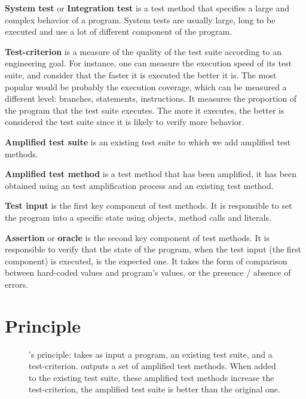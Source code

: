 \textbf{System test} or \textbf{Integration test} is a test method that specifies a large and complex behavior of a program.
System tests are usually large, long to be executed and use a lot of different component of the program.

\textbf{Test-criterion} is a measure of the quality of the test suite according to an engineering goal.
For instance, one can measure the execution speed of its test suite, and consider that the faster it is executed the better it is.
The most popular would be probably the execution coverage, which can be measured a different level: branches, statements, instructions.
It measures the proportion of the program that the test suite executes.
The more it executes, the better is considered the test suite since it is likely to verify more behavior.

\textbf{Amplified test suite} is an existing test suite to which we add amplified test methods.

\textbf{Amplified test method} is a test method that has been amplified, \ie it has been obtained using an test amplification process and an existing test method.

\textbf{Test input} is the first key component of test methods. 
It is responsible to set the program into a specific state using objects, method calls and literals.

\textbf{Assertion} or \textbf{oracle} is the second key component of test methods. 
It is responsible to verify that the state of the program, when the test input (the first component) is executed, is the expected one. 
It takes the form of comparison between hard-coded values and program's values, or the presence / absence of errors.

\section{Principle}
\label{sec:dspot:principle}

\begin{figure}[h]
	\centering
	\caption{
		\dspot's principle: \dspot takes as input a program, an existing test suite, and a test-criterion. 
		\dspot outputs a set of amplified test methods.
		When added to the existing test suite, these amplified test methods increase the test-criterion, \ie the amplified test suite is better than the original one.
	}
	\label{fig:dspot:principle}
\end{figure}

